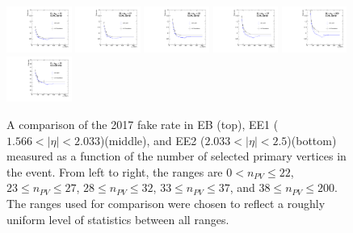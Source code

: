 \begin{figure}[!htbp]
\caption{A comparison of the 2017 fake rate in EB (top), EE1 ($1.566 \mathopen< \mathopen| \eta \mathclose| \mathclose< 2.033$)(middle), and EE2 ($2.033 \mathopen< \mathopen| \eta \mathclose| \mathclose< 2.5$)(bottom) measured as a function of the number of selected primary vertices in the event. From left to right, the ranges are $0 \mathopen< n_{PV} \mathclose\leq 22$, $23 \leq n_{PV} \mathclose\leq 27$, $28 \leq n_{PV} \mathclose\leq 32$, $33 \leq n_{PV} \mathclose\leq 37$, and $38 \leq n_{PV} \mathclose\leq 200$. The ranges used for comparison were chosen to reflect a roughly uniform level of statistics between all ranges.}
\centering
\includegraphics[width=0.19\textwidth]{fig/compare_pv_EB_2017_0to22.pdf}
\includegraphics[width=0.19\textwidth]{fig/compare_pv_EB_2017_23to27.pdf}
\includegraphics[width=0.19\textwidth]{fig/compare_pv_EB_2017_28to32.pdf}
\includegraphics[width=0.19\textwidth]{fig/compare_pv_EB_2017_33to37.pdf}
\includegraphics[width=0.19\textwidth]{fig/compare_pv_EB_2017_38to200.pdf}\\
\includegraphics[width=0.19\textwidth]{fig/compare_pv_EE1_2017_0to22.pdf}

\end{figure}
